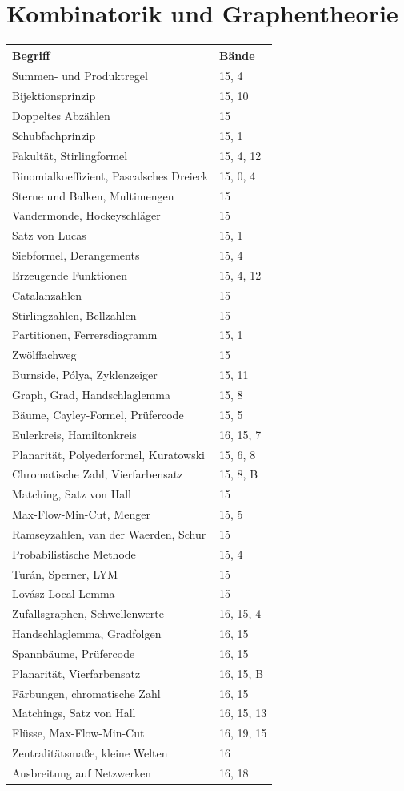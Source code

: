 \section*{Kombinatorik und Graphentheorie}
\nopagebreak
{\small\renewcommand{\arraystretch}{1.32}
\begin{longtable}{@{}P{5.6cm}P{2.8cm}@{}}
\toprule
\textbf{Begriff} & \textbf{Bände}\\
\midrule
\endhead
Summen- und Produktregel & 15, 4\\
Bijektionsprinzip & 15, 10\\
Doppeltes Abzählen & 15\\
Schubfachprinzip & 15, 1\\
Fakultät, Stirlingformel & 15, 4, 12\\
Binomialkoeffizient, Pascalsches Dreieck & 15, 0, 4\\
Sterne und Balken, Multimengen & 15\\
Vandermonde, Hockeyschläger & 15\\
Satz von Lucas & 15, 1\\
Siebformel, Derangements & 15, 4\\
Erzeugende Funktionen & 15, 4, 12\\
Catalanzahlen & 15\\
Stirlingzahlen, Bellzahlen & 15\\
Partitionen, Ferrersdiagramm & 15, 1\\
Zwölffachweg & 15\\
Burnside, Pólya, Zyklenzeiger & 15, 11\\
Graph, Grad, Handschlaglemma & 15, 8\\
Bäume, Cayley-Formel, Prüfercode & 15, 5\\
Eulerkreis, Hamiltonkreis & 16, 15, 7\\
Planarität, Polyederformel, Kuratowski & 15, 6, 8\\
Chromatische Zahl, Vierfarbensatz & 15, 8, B\\
Matching, Satz von Hall & 15\\
Max-Flow-Min-Cut, Menger & 15, 5\\
Ramseyzahlen, van der Waerden, Schur & 15\\
Probabilistische Methode & 15, 4\\
Turán, Sperner, LYM & 15\\
Lovász Local Lemma & 15\\
Zufallsgraphen, Schwellenwerte & 16, 15, 4\\
Handschlaglemma, Gradfolgen & 16, 15\\
Spannbäume, Prüfercode & 16, 15\\
Planarität, Vierfarbensatz & 16, 15, B\\
Färbungen, chromatische Zahl & 16, 15\\
Matchings, Satz von Hall & 16, 15, 13\\
Flüsse, Max-Flow-Min-Cut & 16, 19, 15\\
Zentralitätsmaße, kleine Welten & 16\\
Ausbreitung auf Netzwerken & 16, 18\\
\bottomrule
\end{longtable}}

